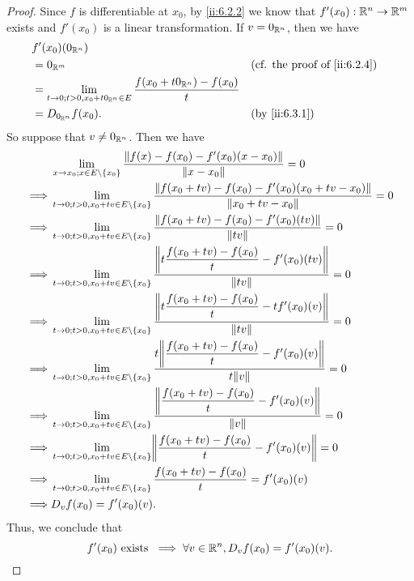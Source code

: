\begin{proof}
  Since \(f\) is differentiable at \(x_0\), by \cref{ii:6.2.2} we know that \(f'(x_0) : \mathbb{R}^n \to \mathbb{R}^m\) exists and \(f'(x_0)\) is a linear transformation.
  If \(v = 0_{\mathbb{R}^n}\), then we have
  \begin{align*}
     & f'(x_0)(0_{\R^n})                                                                                                                       \\
     & = 0_{\R^m}                                                                               &  & \text{(cf. the proof of \cref{ii:6.2.4})} \\
     & = \lim_{t \to 0 ; t > 0, x_0 + t 0_{\R^n} \in E} \dfrac{f(x_0 + t 0_{\R^n}) - f(x_0)}{t}                                                \\
     & = D_{0_{\R^n}} f(x_0).                                                                   &  & \by{ii:6.3.1}
  \end{align*}
  So suppose that \(v \neq 0_{\mathbb{R}^n}\).
  Then we have
  \begin{align*}
             & \lim_{x \to x_0 ; x \in E \setminus \set{x_0}} \dfrac{\norm*{f(x) - f(x_0) - f'(x_0)(x - x_0)}}{\norm*{x - x_0}} = 0                                  \\
    \implies & \lim_{t \to 0 ; t > 0, x_0 + tv \in E \setminus \set{x_0}} \dfrac{\norm*{f(x_0 + tv) - f(x_0) - f'(x_0)(x_0 + tv - x_0)}}{\norm*{x_0 + tv - x_0}} = 0 \\
    \implies & \lim_{t \to 0 ; t > 0, x_0 + tv \in E \setminus \set{x_0}} \dfrac{\norm*{f(x_0 + tv) - f(x_0) - f'(x_0)(tv)}}{\norm*{tv}} = 0                         \\
    \implies & \lim_{t \to 0 ; t > 0, x_0 + tv \in E \setminus \set{x_0}} \dfrac{\norm*{t \dfrac{f(x_0 + tv) - f(x_0)}{t} - f'(x_0)(tv)}}{\norm*{tv}} = 0            \\
    \implies & \lim_{t \to 0 ; t > 0, x_0 + tv \in E \setminus \set{x_0}} \dfrac{\norm*{t \dfrac{f(x_0 + tv) - f(x_0)}{t} - t f'(x_0)(v)}}{\norm*{tv}} = 0           \\
    \implies & \lim_{t \to 0 ; t > 0, x_0 + tv \in E \setminus \set{x_0}} \dfrac{t \norm*{\dfrac{f(x_0 + tv) - f(x_0)}{t} - f'(x_0)(v)}}{t \norm*{v}} = 0            \\
    \implies & \lim_{t \to 0 ; t > 0, x_0 + tv \in E \setminus \set{x_0}} \dfrac{\norm*{\dfrac{f(x_0 + tv) - f(x_0)}{t} - f'(x_0)(v)}}{\norm*{v}} = 0                \\
    \implies & \lim_{t \to 0 ; t > 0, x_0 + tv \in E \setminus \set{x_0}} \norm*{\dfrac{f(x_0 + tv) - f(x_0)}{t} - f'(x_0)(v)} = 0                                   \\
    \implies & \lim_{t \to 0 ; t > 0, x_0 + tv \in E \setminus \set{x_0}} \dfrac{f(x_0 + tv) - f(x_0)}{t} = f'(x_0)(v)                                               \\
    \implies & D_v f(x_0) = f'(x_0)(v).
  \end{align*}
  Thus, we conclude that
  \[
    f'(x_0) \text{ exists } \implies \forall v \in \mathbb{R}^n, D_v f(x_0) = f'(x_0)(v).
  \]
\end{proof}

